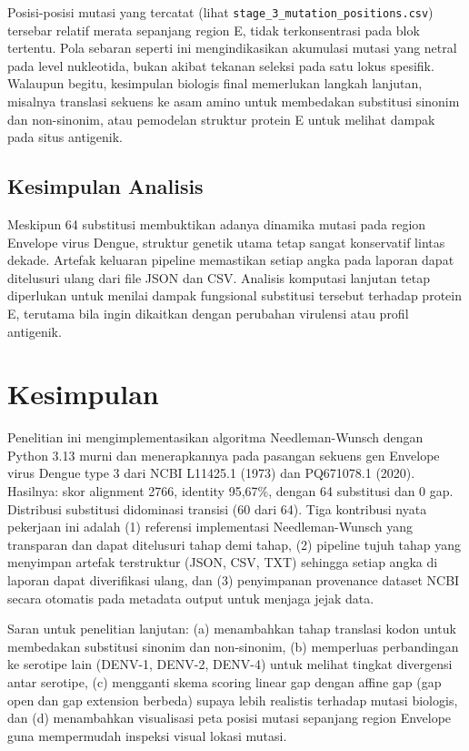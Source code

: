 \documentclass[conference]{IEEEtran}
\begin{document}
Posisi-posisi mutasi yang tercatat (lihat \texttt{stage\_3\_\-mutation\_\-positions.csv}) tersebar relatif merata sepanjang region E, tidak terkonsentrasi pada blok tertentu. Pola sebaran seperti ini mengindikasikan akumulasi mutasi yang netral pada level nukleotida, bukan akibat tekanan seleksi pada satu lokus spesifik. Walaupun begitu, kesimpulan biologis final memerlukan langkah lanjutan, misalnya translasi sekuens ke asam amino untuk membedakan substitusi sinonim dan non-sinonim, atau pemodelan struktur protein E untuk melihat dampak pada situs antigenik.

\subsection{Kesimpulan Analisis}
Meskipun 64 substitusi membuktikan adanya dinamika mutasi pada region Envelope virus Dengue, struktur genetik utama tetap sangat konservatif lintas dekade. Artefak keluaran pipeline memastikan setiap angka pada laporan dapat ditelusuri ulang dari file JSON dan CSV. Analisis komputasi lanjutan tetap diperlukan untuk menilai dampak fungsional substitusi tersebut terhadap protein E, terutama bila ingin dikaitkan dengan perubahan virulensi atau profil antigenik.

\section{Kesimpulan}

Penelitian ini mengimplementasikan algoritma Needleman-Wunsch dengan Python 3.13 murni dan menerapkannya pada pasangan sekuens gen Envelope virus Dengue type 3 dari NCBI L11425.1 (1973) dan PQ671078.1 (2020). Hasilnya: skor alignment 2766, identity 95,67\%, dengan 64 substitusi dan 0 gap. Distribusi substitusi didominasi transisi (60 dari 64). Tiga kontribusi nyata pekerjaan ini adalah (1) referensi implementasi Needleman-Wunsch yang transparan dan dapat ditelusuri tahap demi tahap, (2) pipeline tujuh tahap yang menyimpan artefak terstruktur (JSON, CSV, TXT) sehingga setiap angka di laporan dapat diverifikasi ulang, dan (3) penyimpanan provenance dataset NCBI secara otomatis pada metadata output untuk menjaga jejak data.

Saran untuk penelitian lanjutan: (a) menambahkan tahap translasi kodon untuk membedakan substitusi sinonim dan non-sinonim, (b) memperluas perbandingan ke serotipe lain (DENV-1, DENV-2, DENV-4) untuk melihat tingkat divergensi antar serotipe, (c) mengganti skema scoring linear gap dengan affine gap (gap open dan gap extension berbeda) supaya lebih realistis terhadap mutasi biologis, dan (d) menambahkan visualisasi peta posisi mutasi sepanjang region Envelope guna mempermudah inspeksi visual lokasi mutasi.
\end{document}
